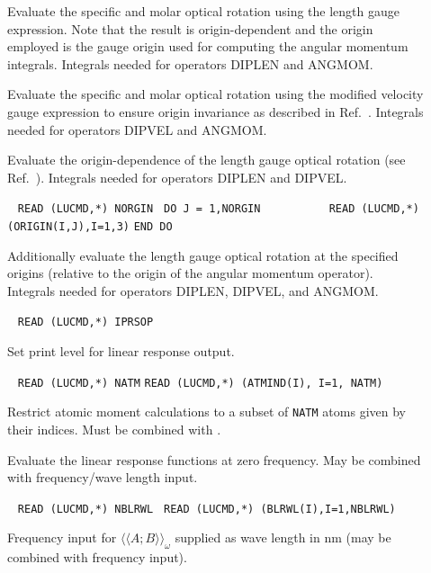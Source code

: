 \begin{description}
\item[] 
Evaluate the specific and molar optical rotation using the length gauge
expression. Note that the result is origin-dependent and the origin employed
is the gauge origin used for computing the angular momentum integrals.
Integrals needed for operators DIPLEN and ANGMOM.

\item[] 
Evaluate the specific and molar optical rotation using the modified velocity
gauge
expression to ensure origin invariance as described in
Ref.\ \cite{Pedersen:ORMVE}.
Integrals needed for operators DIPVEL and ANGMOM.

\item[] 
Evaluate the origin-dependence of the length gauge optical rotation
(see Ref.\ \cite{Pedersen:ORMVE}).
Integrals needed for operators DIPLEN and DIPVEL.

\item[] \verb| |\newline
  \verb|READ (LUCMD,*) NORGIN |\newline
  \verb|DO J = 1,NORGIN       |\newline
  \verb|   READ (LUCMD,*) (ORIGIN(I,J),I=1,3)|\newline
  \verb|END DO|

Additionally evaluate the length gauge optical rotation at the
specified origins (relative to the origin of the angular momentum
operator).
Integrals needed for operators DIPLEN, DIPVEL, and ANGMOM.
 
\item[] \verb| |\newline
   \verb|READ (LUCMD,*) IPRSOP|

Set print level for linear response output.

\item[] \verb| |\newline
   \verb|READ (LUCMD,*) NATM|\newline
   \verb|READ (LUCMD,*) (ATMIND(I), I=1, NATM)|

Restrict atomic moment calculations to a subset of \verb|NATM| atoms given by their indices. Must be combined with .

\item[]
Evaluate the linear response functions at zero frequency.
May be combined with frequency/wave length input.

\item[] \verb| |\newline
   \verb|READ (LUCMD,*) NBLRWL |\newline
   \verb|READ (LUCMD,*) (BLRWL(I),I=1,NBLRWL)|

Frequency input for $\langle\langle A;B \rangle\rangle_{\omega}$
supplied as wave length in nm (may be combined with frequency input).
 
\end{description}
